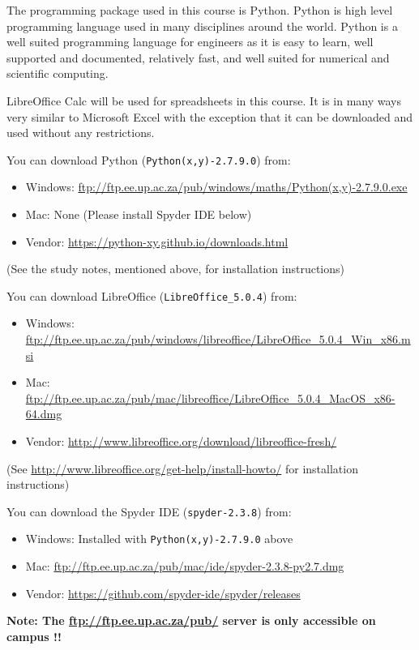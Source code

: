         The programming package used in this course is Python. Python is
        high level programming language used in many disciplines around the
        world. Python is a well suited programming language for engineers as
        it is easy to learn, well supported and documented, relatively fast,
        and well suited for numerical and scientific computing.

        LibreOffice Calc will be used for spreadsheets in this course. It is
        in many ways very similar to Microsoft Excel with the exception
        that it can be downloaded and used without any restrictions.

        \noindent
        You can download Python ({\tt Python(x,y)-2.7.9.0}) from:
        \begin{itemize}
            \item Windows: \url{ftp://ftp.ee.up.ac.za/pub/windows/maths/Python(x,y)-2.7.9.0.exe}
            \item Mac: None (Please install Spyder IDE below)
            \item Vendor: \url{https://python-xy.github.io/downloads.html}
        \end{itemize}
        (See the study notes, mentioned above, for installation instructions)

        \noindent
        You can download LibreOffice
        ({\tt LibreOffice\_5.0.4}) from:
        \begin{itemize}
            \item Windows: \url{ftp://ftp.ee.up.ac.za/pub/windows/libreoffice/LibreOffice_5.0.4_Win_x86.msi}
            \item Mac: \url{ftp://ftp.ee.up.ac.za/pub/mac/libreoffice/LibreOffice_5.0.4_MacOS_x86-64.dmg}
            \item Vendor: \url{http://www.libreoffice.org/download/libreoffice-fresh/}
        \end{itemize}
        (See \url{http://www.libreoffice.org/get-help/install-howto/}
        for installation instructions)

        \noindent
        You can download the Spyder IDE ({\tt spyder-2.3.8}) from:
        \begin{itemize}
            \item Windows: Installed with {\tt Python(x,y)-2.7.9.0} above
            \item Mac: \url{ftp://ftp.ee.up.ac.za/pub/mac/ide/spyder-2.3.8-py2.7.dmg}
            \item Vendor: \url{https://github.com/spyder-ide/spyder/releases}
        \end{itemize}

        \noindent
        \textbf{Note: The \url{ftp://ftp.ee.up.ac.za/pub/} server is only
        accessible on campus !!}
